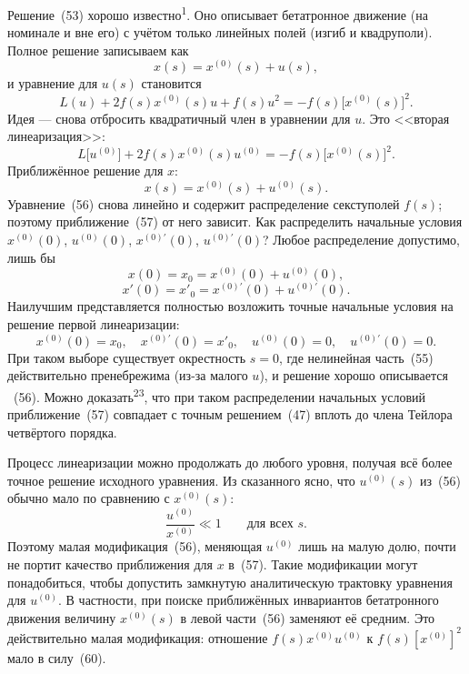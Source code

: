 \documentclass[11pt,a4paper]{article}
\begin{document}
Решение~(53) хорошо известно\textsuperscript{1}. Оно описывает бетатронное
движение (на номинале и вне его) с учётом только линейных полей (изгиб и
квадруполи). Полное решение записываем как
\begin{equation}
x(s)=x^{(0)}(s)+u(s),
\end{equation}
и уравнение для $u(s)$ становится
\begin{equation}
L(u)+2f(s)x^{(0)}(s)u+f(s)u^2=-f(s)\bigl[x^{(0)}(s)\bigr]^2.
\end{equation}
Идея --- снова отбросить квадратичный член в уравнении для $u$. Это <<вторая
линеаризация>>:
\begin{equation}
L\bigl[u^{(0)}\bigr]+2f(s)x^{(0)}(s)u^{(0)}=-f(s)\bigl[x^{(0)}(s)\bigr]^2.
\end{equation}
Приближённое решение для $x$:
\begin{equation}
x(s)=x^{(0)}(s)+u^{(0)}(s).
\end{equation}
Уравнение~(56) снова линейно и содержит распределение секступолей $f(s)$; поэтому
приближение~(57) от него зависит. Как распределить начальные условия
$x^{(0)}(0)$, $u^{(0)}(0)$, $x^{(0)\prime}(0)$, $u^{(0)\prime}(0)$? Любое
распределение допустимо, лишь бы
\begin{equation}
x(0)=x_0=x^{(0)}(0)+u^{(0)}(0),
\end{equation}
\begin{equation}
x'(0)=x'_0=x^{(0)\prime}(0)+u^{(0)\prime}(0).
\end{equation}
Наилучшим представляется полностью возложить точные начальные условия на решение
первой линеаризации:
\[
x^{(0)}(0)=x_0,\quad
x^{(0)\prime}(0)=x'_0,\quad
u^{(0)}(0)=0,\quad
u^{(0)\prime}(0)=0.
\]
При таком выборе существует окрестность $s=0$, где нелинейная часть~(55)
действительно пренебрежима (из-за малого $u$), и решение хорошо описывается
~(56). Можно доказать\textsuperscript{23}, что при таком распределении начальных
условий приближение~(57) совпадает с точным решением~(47) вплоть до члена
Тейлора четвёртого порядка.

Процесс линеаризации можно продолжать до любого уровня, получая всё более точное
решение исходного уравнения. Из сказанного ясно, что $u^{(0)}(s)$ из~(56) обычно
мало по сравнению с $x^{(0)}(s)$:
\begin{equation}
\frac{u^{(0)}}{x^{(0)}}\ll 1\qquad\text{для всех }s.
\end{equation}
Поэтому малая модификация~(56), меняющая $u^{(0)}$ лишь на малую долю, почти не
портит качество приближения для $x$ в~(57). Такие модификации могут понадобиться,
чтобы допустить замкнутую аналитическую трактовку уравнения для $u^{(0)}$. В
частности, при поиске приближённых инвариантов бетатронного движения величину
$x^{(0)}(s)$ в левой части~(56) заменяют её средним. Это действительно малая
модификация: отношение $f(s)x^{(0)}u^{(0)}$ к $f(s)[x^{(0)}]^2$ мало в силу~(60).
\end{document}
